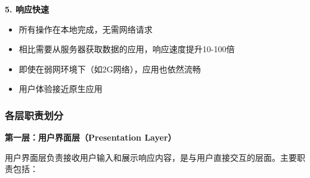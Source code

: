 \documentclass[12pt,a4paper]{article}
\begin{document}
\textbf{5. 响应快速}
\begin{itemize}
    \item 所有操作在本地完成，无需网络请求
    \item 相比需要从服务器获取数据的应用，响应速度提升10-100倍
    \item 即使在弱网环境下（如2G网络），应用也依然流畅
    \item 用户体验接近原生应用
\end{itemize}

\subsubsection{各层职责划分}

\textbf{第一层：用户界面层（Presentation Layer）}

用户界面层负责接收用户输入和展示响应内容，是与用户直接交互的层面。主要职责包括：
\end{document}
